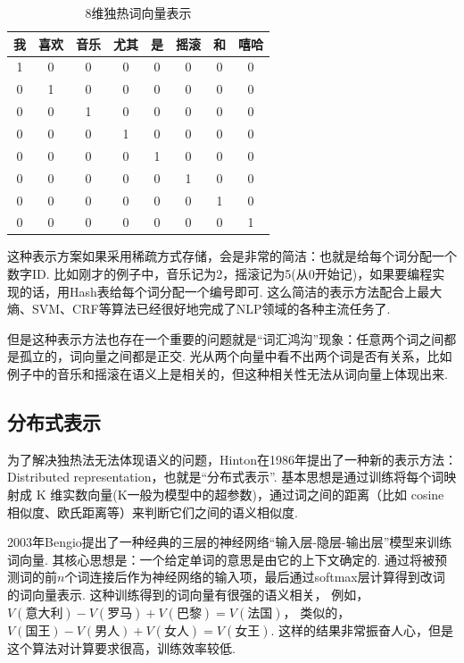 \documentclass[bachelor,winfonts]{jnuthesis}
\begin{document}
\begin{table}[h!]
  \centering
  \begin{tabular}{cccccccc}
    \toprule
    \textbf{我} & \textbf{喜欢} & \textbf{音乐} & \textbf{尤其} & \textbf{是} & \textbf{摇滚}  & \textbf{和} & \textbf{嘻哈}  \\
    \midrule
    1 & 0 & 0 & 0 & 0 & 0 & 0 & 0 \\
    0 & 1 & 0 & 0 & 0 & 0 & 0 & 0 \\
    0 & 0 & 1 & 0 & 0 & 0 & 0 & 0 \\
    0 & 0 & 0 & 1 & 0 & 0 & 0 & 0 \\
    0 & 0 & 0 & 0 & 1 & 0 & 0 & 0 \\
    0 & 0 & 0 & 0 & 0 & 1 & 0 & 0 \\
    0 & 0 & 0 & 0 & 0 & 0 & 1 & 0 \\
    0 & 0 & 0 & 0 & 0 & 0 & 0 & 1 \\
    \bottomrule
  \end{tabular}
  \caption{8维独热词向量表示}\label{table:3t1}
\end{table}

这种表示方案如果采用稀疏方式存储，会是非常的简洁：也就是给每个词分配一个数字ID.
比如刚才的例子中，音乐记为2，摇滚记为5(从0开始记)，如果要编程实现的话，用Hash表给每个词分配一个编号即可.
这么简洁的表示方法配合上最大熵、SVM、CRF等算法已经很好地完成了NLP领域的各种主流任务了.

但是这种表示方法也存在一个重要的问题就是“词汇鸿沟”现象：任意两个词之间都是孤立的，词向量之间都是正交.
光从两个向量中看不出两个词是否有关系，比如例子中的音乐和摇滚在语义上是相关的，但这种相关性无法从词向量上体现出来.

\subsection{分布式表示}
为了解决独热法无法体现语义的问题，Hinton在1986年提出了一种新的表示方法：Distributed representation，也就是“分布式表示”.
基本思想是通过训练将每个词映射成 K 维实数向量(K一般为模型中的超参数)，通过词之间的距离（比如 cosine 相似度、欧氏距离等）来判断它们之间的语义相似度.

2003年Bengio提出了一种经典的三层的神经网络“输入层-隐层-输出层”模型来训练词向量.
其核心思想是：一个给定单词的意思是由它的上下文确定的.
通过将被预测词的前$n$个词连接后作为神经网络的输入项，最后通过softmax层计算得到改词的词向量表示.
这种训练得到的词向量有很强的语义相关，
例如，$V(\mbox{意大利})-V(\mbox{罗马})+V(\mbox{巴黎}) = V(\mbox{法国})$，
类似的，$V(\mbox{国王})-V(\mbox{男人})+V(\mbox{女人})=V(\mbox{女王})$.
这样的结果非常振奋人心，但是这个算法对计算要求很高，训练效率较低.
\end{document}
